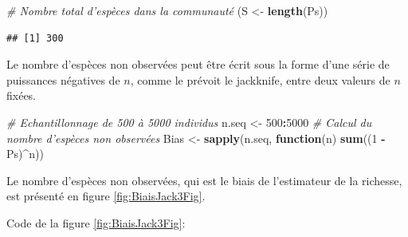\documentclass[
  11pt,
  french,
  a4paper,
  extrafontsizes,onecolumn,openright
  ]{memoir}
\newenvironment{Shaded}{\begin{snugshade}}{\end{snugshade}}
\newcommand{\CommentTok}[1]{\textcolor[rgb]{0.56,0.35,0.01}{\textit{#1}}}
\newcommand{\ControlFlowTok}[1]{\textcolor[rgb]{0.13,0.29,0.53}{\textbf{#1}}}
\newcommand{\DecValTok}[1]{\textcolor[rgb]{0.00,0.00,0.81}{#1}}
\newcommand{\KeywordTok}[1]{\textcolor[rgb]{0.13,0.29,0.53}{\textbf{#1}}}
\newcommand{\NormalTok}[1]{#1}
\newcommand{\OperatorTok}[1]{\textcolor[rgb]{0.81,0.36,0.00}{\textbf{#1}}}
\newcommand{\StringTok}[1]{\textcolor[rgb]{0.31,0.60,0.02}{#1}}
\begin{document}
\begin{Shaded}
\begin{Highlighting}[]
\CommentTok{# Nombre total d'espèces dans la communauté}
\NormalTok{(S <-}\StringTok{ }\KeywordTok{length}\NormalTok{(Ps))}
\end{Highlighting}
\end{Shaded}

\begin{verbatim}
## [1] 300
\end{verbatim}

\normalsize

Le nombre d'espèces non observées peut être écrit sous la forme d'une série de puissances négatives de \(n\), comme le prévoit le jackknife, entre deux valeurs de \(n\) fixées.

\scriptsize

\begin{Shaded}
\begin{Highlighting}[]
\CommentTok{# Echantillonnage de 500 à 5000 individus}
\NormalTok{n.seq <-}\StringTok{ }\DecValTok{500}\OperatorTok{:}\DecValTok{5000}
\CommentTok{# Calcul du nombre d'espèces non observées}
\NormalTok{Bias <-}\StringTok{ }\KeywordTok{sapply}\NormalTok{(n.seq, }\ControlFlowTok{function}\NormalTok{(n) }\KeywordTok{sum}\NormalTok{((}\DecValTok{1} \OperatorTok{-}\StringTok{ }\NormalTok{Ps)}\OperatorTok{^}\NormalTok{n))}
\end{Highlighting}
\end{Shaded}

\normalsize

Le nombre d'espèces non observées, qui est le biais de l'estimateur de la richesse, est présenté en figure \ref{fig:BiaisJack3Fig}.

Code de la figure \ref{fig:BiaisJack3Fig}:

\scriptsize
\end{document}

